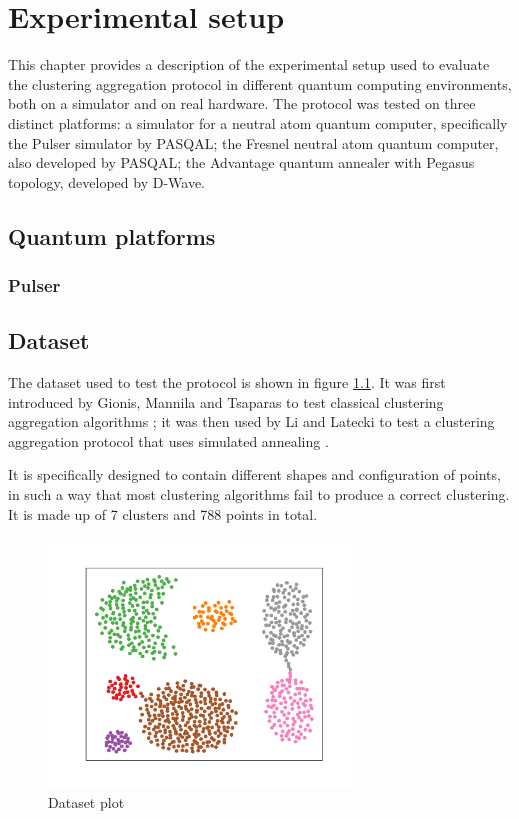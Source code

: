 \chapter{Experimental setup}
This chapter provides a description of the experimental setup used to evaluate the clustering aggregation protocol in different quantum computing environments, both on a simulator and on real hardware. The protocol was tested on three distinct platforms: a simulator for a neutral atom quantum computer, specifically the Pulser simulator by PASQAL; the Fresnel neutral atom quantum computer, also developed by PASQAL; the Advantage quantum annealer with Pegasus topology, developed by D-Wave.

\section{Quantum platforms}
\subsection{Pulser}



\section{Dataset}
\label{sec:dataset}
The dataset used to test the protocol is shown in figure \ref{fig:dataset}. It was first introduced by Gionis, Mannila and Tsaparas to test classical clustering aggregation algorithms \cite{dataset}; it was then used by Li and Latecki to test a clustering aggregation protocol that uses simulated annealing \cite{aggregation}.

It is specifically designed to contain different shapes and configuration of points, in such a way that most clustering algorithms fail to produce a correct clustering. It is made up of 7 clusters and 788 points in total.

\begin{figure}[ht!]
  \centering 
  \includegraphics[width=0.72\textwidth]{figures/05experimental_setup/dataset.pdf}
  \caption{Dataset plot}
  \label{fig:dataset}
\end{figure}

